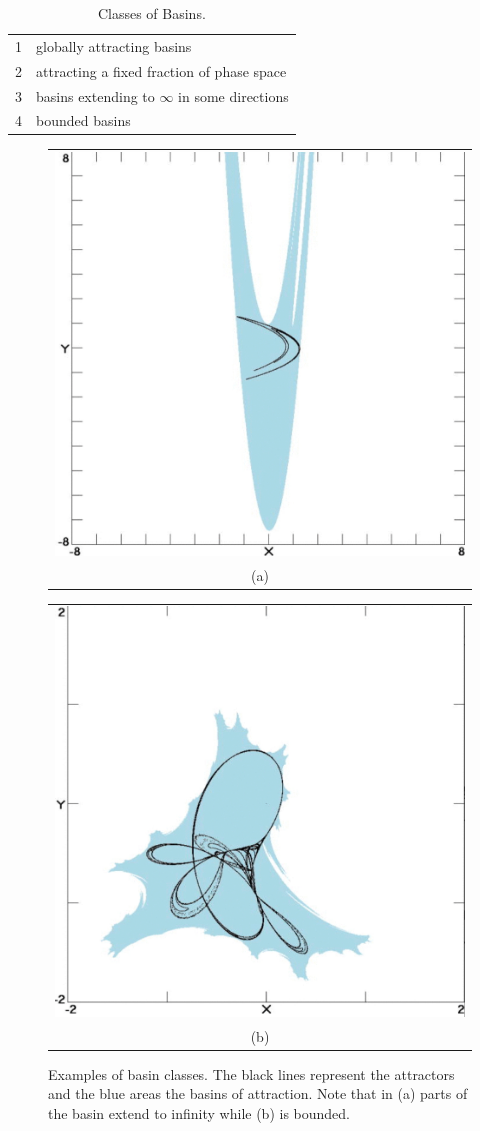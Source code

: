 \begin{table}[ht]
\centering
\caption[Classes of Basins]{Classes of Basins. \cite{classify}}
\begin{tabular}{l l}
\hline
1       &  globally attracting basins\\
2       &  attracting a fixed fraction of phase space\\
3       & basins extending to $\infty$ in some directions\\
4       & bounded basins\\                
\hline
\end{tabular}
\label{t:class}
\end{table}
\begin{figure}
    \centering
    \begin{tabular}[b]{c}
        \includegraphics[width=.4\linewidth]{figures/IMG_0769.jpg} \\
        \small (a)
    \end{tabular} \qquad
    \begin{tabular}[b]{c}
        \includegraphics[width=.4\linewidth]{figures/IMG_0770.jpg} \\
        \small (b)
    \end{tabular}



    \caption[Examples of Basin Classes]{Examples of basin classes. The black lines represent the attractors and the blue areas the basins of attraction. Note that in (a) parts of the basin extend to infinity while (b) is bounded. \cite{classify}}%
    \label{fig:classes}%
\end{figure}

